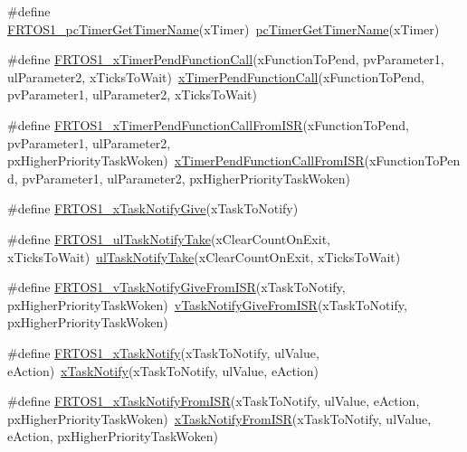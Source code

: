 \begin{DoxyCompactItemize}
\item 
\#define \hyperlink{group___f_r_t_o_s1__module_ga24e3ac503fa0d8a6b279b2f268b903bf}{F\+R\+T\+O\+S1\+\_\+pc\+Timer\+Get\+Timer\+Name}(x\+Timer)~\hyperlink{_free_r_t_o_s_8h_a870358d5faa01a5290705b073de220ca}{pc\+Timer\+Get\+Timer\+Name}(x\+Timer)
\item 
\#define \hyperlink{group___f_r_t_o_s1__module_ga6c21b01372d4e1ae37373834463931b9}{F\+R\+T\+O\+S1\+\_\+x\+Timer\+Pend\+Function\+Call}(x\+Function\+To\+Pend,  pv\+Parameter1,  ul\+Parameter2,  x\+Ticks\+To\+Wait)~\hyperlink{timers_8h_a04e031135bd3276caaedd656d464dc23}{x\+Timer\+Pend\+Function\+Call}(x\+Function\+To\+Pend, pv\+Parameter1, ul\+Parameter2, x\+Ticks\+To\+Wait)
\item 
\#define \hyperlink{group___f_r_t_o_s1__module_ga4363dc4e6778d35b6690ccd1b00360f4}{F\+R\+T\+O\+S1\+\_\+x\+Timer\+Pend\+Function\+Call\+From\+I\+SR}(x\+Function\+To\+Pend,  pv\+Parameter1,  ul\+Parameter2,  px\+Higher\+Priority\+Task\+Woken)~\hyperlink{timers_8h_ae0d9338933037e6feebe6437763fa299}{x\+Timer\+Pend\+Function\+Call\+From\+I\+SR}(x\+Function\+To\+Pend, pv\+Parameter1, ul\+Parameter2, px\+Higher\+Priority\+Task\+Woken)
\item 
\#define \hyperlink{group___f_r_t_o_s1__module_ga21518a501d4f0f93d5621994c584d46a}{F\+R\+T\+O\+S1\+\_\+x\+Task\+Notify\+Give}(x\+Task\+To\+Notify)
\item 
\#define \hyperlink{group___f_r_t_o_s1__module_gaf1433e0d6225f6cc3a1c444062f733c8}{F\+R\+T\+O\+S1\+\_\+ul\+Task\+Notify\+Take}(x\+Clear\+Count\+On\+Exit,  x\+Ticks\+To\+Wait)~\hyperlink{tasks_8c_a1dd29cf3d25f9968ac86b0ca35af8ada}{ul\+Task\+Notify\+Take}(x\+Clear\+Count\+On\+Exit, x\+Ticks\+To\+Wait)
\item 
\#define \hyperlink{group___f_r_t_o_s1__module_ga73c2c7768f269d024adee0678786e15e}{F\+R\+T\+O\+S1\+\_\+v\+Task\+Notify\+Give\+From\+I\+SR}(x\+Task\+To\+Notify,  px\+Higher\+Priority\+Task\+Woken)~\hyperlink{tasks_8c_a0c31cb4be76285f05909de23ede05331}{v\+Task\+Notify\+Give\+From\+I\+SR}(x\+Task\+To\+Notify, px\+Higher\+Priority\+Task\+Woken)
\item 
\#define \hyperlink{group___f_r_t_o_s1__module_ga90bc9fa15ace079ad1d8fc419f51365d}{F\+R\+T\+O\+S1\+\_\+x\+Task\+Notify}(x\+Task\+To\+Notify,  ul\+Value,  e\+Action)~\hyperlink{task_8h_a0d2d54fb8a64011dfbb54983e4ed06bd}{x\+Task\+Notify}(x\+Task\+To\+Notify, ul\+Value, e\+Action)
\item 
\#define \hyperlink{group___f_r_t_o_s1__module_ga9943041478b4b481aa0a8670c6edd4be}{F\+R\+T\+O\+S1\+\_\+x\+Task\+Notify\+From\+I\+SR}(x\+Task\+To\+Notify,  ul\+Value,  e\+Action,  px\+Higher\+Priority\+Task\+Woken)~\hyperlink{task_8h_a1ed9129068b96a909356bd0369c5ecb0}{x\+Task\+Notify\+From\+I\+SR}(x\+Task\+To\+Notify, ul\+Value, e\+Action, px\+Higher\+Priority\+Task\+Woken)

\end{DoxyCompactItemize}
